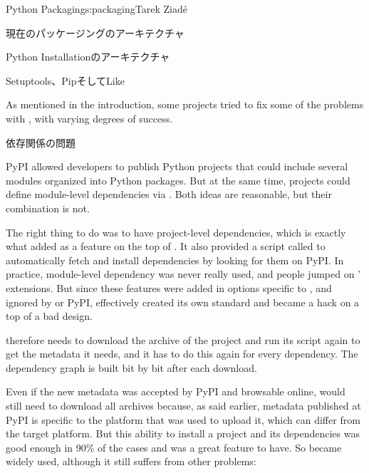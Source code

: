 \begin{aosachapter}{Python Packaging}{s:packaging}{Tarek Ziad\'{e}}
\begin{aosasect1}{現在のパッケージングのアーキテクチャ}
\begin{aosasect2}{Python Installationのアーキテクチャ}
\end{aosasect2}

\begin{aosasect2}{Setuptools、PipそしてLike}

As mentioned in the introduction, some projects tried to fix some of
the problems with , with varying degrees of success.

\begin{aosasect3}{依存関係の問題}

PyPI allowed developers to publish Python projects that could include
several modules organized into Python packages. But at the same time,
projects could define module-level dependencies via .
Both ideas are reasonable, but their combination is not.

The right thing to do was to have project-level dependencies, which is
exactly what  added as a feature on the top of
.  It also provided a script called
 to automatically fetch and install dependencies
by looking for them on PyPI\@.  In practice, module-level dependency was
never really used, and people jumped on ' extensions.
But since these features were added in options specific to
, and ignored by  or PyPI,
 effectively created its own standard and became a
hack on a top of a bad design.

 therefore needs to download the archive of the
project and run its  script again to get the metadata
it needs, and it has to do this again for every dependency. The
dependency graph is built bit by bit after each download.

Even if the new metadata was accepted by PyPI and browsable online,
 would still need to download all archives
because, as said earlier, metadata published at PyPI is specific to
the platform that was used to upload it, which can differ from the
target platform.  But this ability to install a project and its
dependencies was good enough in 90\% of the cases and was a great
feature to have. So  became widely used, although it
still suffers from other problems:

\begin{aosaitemize}


\end{aosaitemize}
\end{aosasect3}
\end{aosasect2}
\end{aosasect1}
\end{aosachapter}
